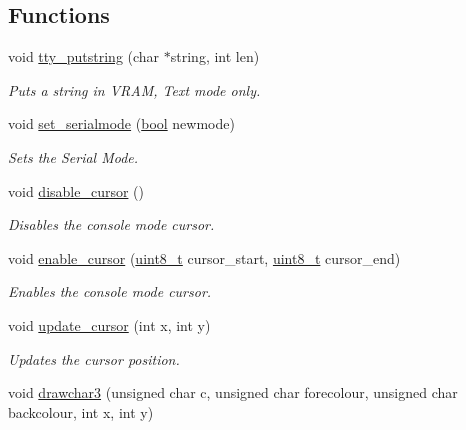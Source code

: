 \subsection*{Functions}
\begin{DoxyCompactItemize}
\item 
void \hyperlink{a00173_a5b5bf610a57f3c59b2851fa2652081ec_a5b5bf610a57f3c59b2851fa2652081ec}{tty\+\_\+putstring} (char $\ast$string, int len)
\begin{DoxyCompactList}\small\item\em Puts a string in V\+R\+AM, Text mode only. \end{DoxyCompactList}\item 
void \hyperlink{a00173_ab1cdfeb7dac30904e66f81ab673ed8ca_ab1cdfeb7dac30904e66f81ab673ed8ca}{set\+\_\+serialmode} (\hyperlink{a00134_af6a258d8f3ee5206d682d799316314b1_af6a258d8f3ee5206d682d799316314b1}{bool} newmode)
\begin{DoxyCompactList}\small\item\em Sets the Serial Mode. \end{DoxyCompactList}\item 
void \hyperlink{a00173_a3d09038c7b6436e60b228f2f3f451f6a_a3d09038c7b6436e60b228f2f3f451f6a}{disable\+\_\+cursor} ()
\begin{DoxyCompactList}\small\item\em Disables the console mode cursor. \end{DoxyCompactList}\item 
void \hyperlink{a00173_afe197dc4dbfa6036ef04abd2aeeeca2d_afe197dc4dbfa6036ef04abd2aeeeca2d}{enable\+\_\+cursor} (\hyperlink{a00134_aba7bc1797add20fe3efdf37ced1182c5_aba7bc1797add20fe3efdf37ced1182c5}{uint8\+\_\+t} cursor\+\_\+start, \hyperlink{a00134_aba7bc1797add20fe3efdf37ced1182c5_aba7bc1797add20fe3efdf37ced1182c5}{uint8\+\_\+t} cursor\+\_\+end)
\begin{DoxyCompactList}\small\item\em Enables the console mode cursor. \end{DoxyCompactList}\item 
void \hyperlink{a00173_a492f5021d7340613e732ef37bbaa04e4_a492f5021d7340613e732ef37bbaa04e4}{update\+\_\+cursor} (int x, int y)
\begin{DoxyCompactList}\small\item\em Updates the cursor position. \end{DoxyCompactList}\item 
void \hyperlink{a00173_acb9a978008cfa67b0038e85eb56d2d41_acb9a978008cfa67b0038e85eb56d2d41}{drawchar3} (unsigned char c, unsigned char forecolour, unsigned char backcolour, int x, int y)

\end{DoxyCompactItemize}
